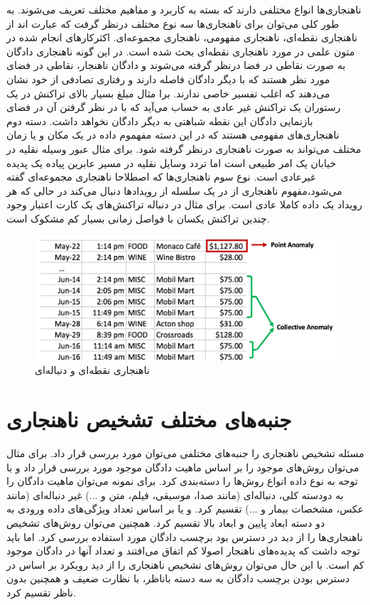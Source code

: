 \documentclass[12pt,a4paper]{report}
\theoremstyle{definition}
\theoremstyle{definition}
\begin{document}
ناهنجاری‌ها انواع مختلفی دارند که بسته به کاربرد و مفاهیم مختلف تعریف می‌شوند. به طور کلی می‌توان برای ناهنجاری‌ها سه نوع مختلف درنظر گرفت که عبارت اند از ناهنجاری نقطه‌ای،‌ ناهنجاری مفهومی‌،‌ ناهنجاری مجموعه‌ای. اکثرکارهای انجام شده در متون علمی در مورد ناهنجاری نقطه‌ای بحث شده است. در این گونه ناهنجاری دادگان به صورت نقاطی در فضا درنظر گرفته می‌شوند و دادگان ناهنجار، نقاطی در فضای مورد نظر هستند که با دیگر دادگان فاصله دارند و رفتاری تصادفی از خود نشان می‌دهند که اغلب تفسیر خاصی ندارند. برا مثال مبلغ بسیار بالای تراکنش در یک رستوران  یک تراکنش غیر عادی به حساب می‌آید که با در نظر گرفتن آن در فضای بازنمایی دادگان این نقطه شباهتی به دیگر دادگان نخواهد داشت. دسته دوم ناهنجاری‌های مفهومی هستند که در این دسته مفهموم داده در یک مکان‌ و یا زمان‌ مختلف می‌تواند به صورت ناهنجاری درنظر گرفته شود. برای مثال عبور وسیله نقلیه در خیابان یک امر طبیعی است اما تردد وسایل نقلیه در مسیر عابرین پیاده یک پدیده غیرعادی است. نوع سوم ناهنجاری‌ها که اصطلاحا ناهنجاری مجموعه‌ای گفته می‌شود،‌مفهوم ناهنجاری از در یک سلسله از رویدادها دنبال می‌کند در حالی که هر رویداد یک داده کاملا عادی است. برای مثال در دنباله تراکنش‌های یک کارت اعتبار وجود چندین تراکنش یکسان با فواصل زمانی بسیار کم مشکوک است.

\begin{figure}[!hp]
	\begin{center}
		\includegraphics[width=0.7\linewidth]{./images/figures/credit-card.png}

		\caption{
		ناهنجاری نقطه‌ای و دنباله‌ای
		\cite{G.Chalapathy}
		}		
		\label{fig:anomaly-example-1}
		\centering
	\end{center}
\end{figure}

\section{جنبه‌های مختلف تشخیص ناهنجاری}
مسئله تشخیص ناهنجاری را جنبه‌های مختلفی می‌توان مورد بررسی قرار داد. برای مثال می‌توان روش‌های موجود را بر اساس ماهیت دادگان موجود مورد بررسی قرار داد و با توجه به نوع داده انواع روش‌ها را دسته‌بندی کرد. برای نمونه می‌توان ماهیت دادگان را به دودسته کلی، دنباله‌ای (مانند صدا، موسیقی، فیلم، متن و ...) غیر دنباله‌ای (مانند عکس، مشخصات بیمار و ...) تقسیم کرد. و یا بر اساس تعداد ویژگی‌های داده ورودی به دو دسته ابعاد پایین و ابعاد بالا تقسیم کرد. همچنین می‌توان روش‌های تشخیص ناهنجاری‌ها را از دید در دسترس بود برچسب دادگان مورد استفاده بررسی کرد. اما باید توجه داشت که پدیده‌های ناهنجار اصولا کم اتفاق می‌افتند و تعداد آنها در دادگان موجود کم است. با این حال می‌توان روش‌های تشخیص ناهنجاری را از دید رویکرد بر اساس در دسترس بودن برچسب دادگان به سه دسته باناظر، با نظارت ضعیف و همچنین بدون ناظر تقسیم کرد.
\end{document}

